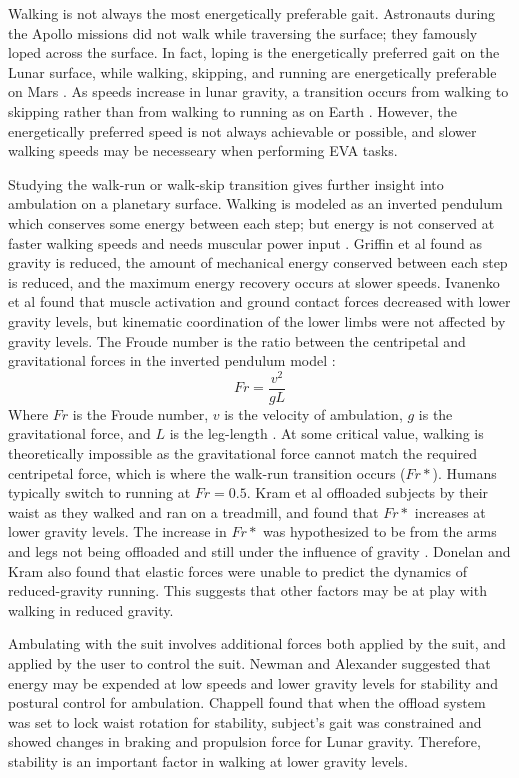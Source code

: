 \documentclass[defaultstyle,11pt]{comps}
\begin{document}
Walking is not always the most energetically preferable gait.
Astronauts during the Apollo missions did not walk while traversing the surface; they famously loped across the surface.
In fact, loping is the energetically preferred gait on the Lunar surface, while walking, skipping, and running are energetically preferable on Mars \citep{Ackermann2012b}.
As speeds increase in lunar gravity, a transition occurs from walking to skipping rather than from walking to running as on Earth \citep{Minetti2012}.
However, the energetically preferred speed is not always achievable or possible, and slower walking speeds may be necesseary when performing EVA tasks.

Studying the walk-run or walk-skip transition gives further insight into ambulation on a planetary surface.
Walking is modeled as an inverted pendulum which conserves some energy between each step; but energy is not conserved at faster walking speeds and needs muscular power input \citep{Cavagna1976, Cavagna1977}.
Griffin et al \citep{Griffin1999} found as gravity is reduced, the amount of mechanical energy conserved between each step is reduced, and the maximum energy recovery occurs at slower speeds.
Ivanenko et al \citep{Ivanenko2002} found that muscle activation and ground contact forces decreased with lower gravity levels, but kinematic coordination of the lower limbs were not affected by gravity levels.
The Froude number is the ratio between the centripetal and gravitational forces in the inverted pendulum model :
\[
Fr=\frac{v^{2}}{gL}
\]
Where \(Fr\) is the Froude number, \(v\) is the velocity of ambulation, \(g\) is the gravitational force, and \(L\) is the leg-length \citep{AlexanderMcN.1989}.
At some critical value, walking is theoretically impossible as the gravitational force cannot match the required centripetal force, which is where the walk-run transition occurs (\(Fr*\)).
Humans typically switch to running at \(Fr=0.5\).
Kram et al \citep{Kram1997} offloaded subjects by their waist as they walked and ran on a treadmill, and found that \(Fr*\) increases at lower gravity levels.
The increase in \(Fr*\) was hypothesized to be from the arms and legs not being offloaded and still under the influence of gravity \citep{Kram1997}.
Donelan and Kram \citep{Donelan2000} also found that elastic forces were unable to predict the dynamics of reduced-gravity running.
This suggests that other factors may be at play with walking in reduced gravity.

Ambulating with the suit involves additional forces both applied by the suit, and applied by the user to control the suit.
Newman and Alexander \citep{Newman1993} suggested that energy may be expended at low speeds and lower gravity levels for stability and postural control for ambulation.
Chappell \citep{Chappell2006} found that when the offload system was set to lock waist rotation for stability, subject's gait was constrained and showed changes in braking and propulsion force for Lunar gravity.
Therefore, stability is an important factor in walking at lower gravity levels.
\end{document}
